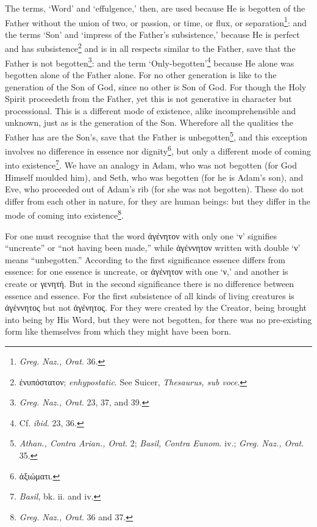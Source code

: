 The terms, ‘Word’ and ‘effulgence,’ then, are used because He is begotten of the Father without the union of two, or passion, or time, or flux, or separation\footnote{\emph{Greg. Naz., Orat}. 36.}: and the terms ‘Son’ and ‘impress of the Father’s subsistence,’ because He is perfect and has subsistence\footnote{\textgreek{ἐνυπόστατον}; \emph{enhypostatic}. See Suicer, \emph{Thesaurus, sub voce}.} and is in all respects similar to the Father, save that the Father is not begotten\footnote{\emph{Greg. Naz., Orat}. 23, 37, and 39.}: and the term ‘Only-begotten’\footnote{Cf. \emph{ibid}. 23, 36.} because He alone was begotten alone of the Father alone. For no other generation is like to the generation of the Son of God, since no other is Son of God. For though the Holy Spirit proceedeth from the Father, yet this is not generative in character but processional. This is a different mode of existence, alike incomprehensible and unknown, just as is the generation of the Son. Wherefore all the qualities the Father has are the Son’s, save that the Father is unbegotten\footnote{\emph{Athan., Contra Arian., Orat}. 2; \emph{Basil, Contra Eunom}. iv.; \emph{Greg. Naz., Orat}. 35.}, and this exception involves no difference in essence nor dignity\footnote{\textgreek{ἀξιώματι}.}, but only a different mode of coming into existence\footnote{\emph{Basil}, bk. ii. and iv.}. We have an analogy in Adam, who was not begotten (for God Himself moulded him), and Seth, who was begotten (for he is Adam’s son), and Eve, who proceeded out of Adam’s rib (for she was not begotten). These do not differ from each other in nature, for they are human beings: but they differ in the mode of coming into existence\footnote{\emph{Greg. Naz., Orat}. 36 and 37.}.

For one must recognise that the word \textgreek{ἀγένητον} with only one ‘\textgreek{ν}’ signifies “uncreate” or “not having been made,” while \textgreek{ἀγέννητον} written with double ‘\textgreek{ν}’ means “unbegotten.” According to the first significance essence differs from essence: for one essence is uncreate, or \textgreek{ἀγένητον} with one ‘\textgreek{ν},’ and another is create or \textgreek{γενητή}. But in the second significance there is no difference between essence and essence. For the first subsistence of all kinds of living creatures is \textgreek{ἀγέννητος} but not \textgreek{ἀγένητος}. For they were created by the Creator, being brought into being by His Word, but they were not begotten, for there was no pre-existing form like themselves from which they might have been born.

